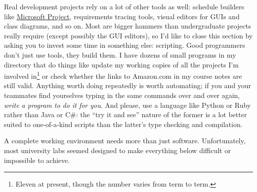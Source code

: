 \documentclass{report}
\begin{document}
Real development projects rely on a lot of other tools as well:
schedule builders like \url{Microsoft Project}, requirements tracing
tools, visual editors for GUIs and class diagrams, and so on.  Most
are bigger hammers than undergraduate projects really require (except
possibly the GUI editors), so I'd like to close this section by asking
you to invest some time in something else: scripting.  Good
programmers don't just use tools, they build them.  I have dozens of
small programs in my  directory that do things like update
my working copies of all the projects I'm involved in\footnote{Eleven
at present, though the number varies from term to term.} or check
whether the links to Amazon.com in my course notes are still valid.
Anything worth doing repeatedly is worth automating; if you and your
teammates find yourselves typing in the same commands over and over
again, \emph{write a program to do it for you}.  And please, use a
language like Python or Ruby rather than Java or C\#: the ``try it and
see'' nature of the former is a lot better suited to one-of-a-kind
scripts than the latter's type checking and compilation.


A complete working environment needs more than just software.
Unfortunately, most university labs seemed designed to make everything
below difficult or impossible to achieve.
\end{document}
